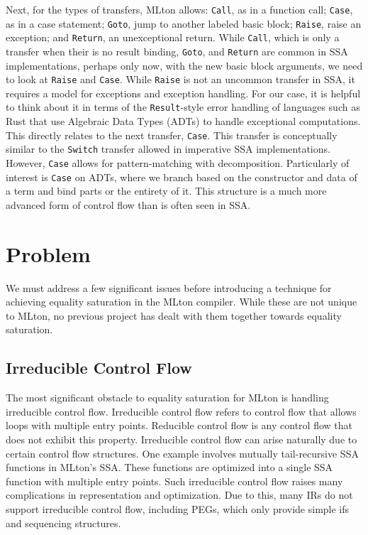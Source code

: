 \documentclass{article}
\begin{document}
Next, for the types of transfers, MLton allows: \verb|Call|, as in a function call; \verb|Case|, as in a case statement; \verb|Goto|, jump to another labeled basic block; \verb|Raise|, raise an exception; and \verb|Return|, an unexceptional return. While \verb|Call|, which is only a transfer when their is no result binding, \verb|Goto|, and \verb|Return| are common in SSA implementations, perhaps only now, with the new basic block arguments, we need to look at \verb|Raise| and \verb|Case|. While \verb|Raise| is not an uncommon transfer in SSA, it requires a model for exceptions and exception handling. For our case, it is helpful to think about it in terms of the \verb|Result|-style error handling of languages such as Rust that use Algebraic Data Types (ADTs) to handle exceptional computations. This directly relates to the next transfer, \verb|Case|. This transfer is conceptually similar to the \verb|Switch| transfer allowed in imperative SSA implementations. However, \verb|Case| allows for pattern-matching with decomposition. Particularly of interest is \verb|Case| on ADTs, where we branch based on the constructor and data of a term and bind parts or the entirety of it. This structure is a much more advanced form of control flow than is often seen in SSA.



\section{Problem}

We must address a few significant issues before introducing a technique for achieving equality saturation in the MLton compiler. While these are not unique to MLton, no previous project has dealt with them together towards equality saturation.

\subsection{Irreducible Control Flow}

The most significant obstacle to equality saturation for MLton is handling irreducible control flow. Irreducible control flow refers to control flow that allows loops with multiple entry points. Reducible control flow is any control flow that does not exhibit this property. Irreducible control flow can arise naturally due to certain control flow structures. One example involves mutually tail-recursive SSA functions in MLton's SSA. These functions are optimized into a single SSA function with multiple entry points. Such irreducible control flow raises many complications in representation and optimization. Due to this, many IRs do not support irreducible control flow, including PEGs, which only provide simple ifs and sequencing structures.
\end{document}
